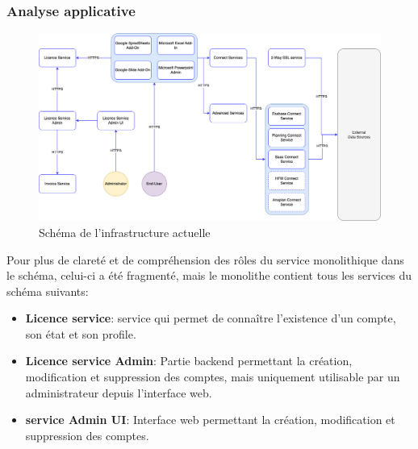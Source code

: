 \documentclass[a4paper, 11pt]{report}
\begin{document}
\subsubsection{Analyse applicative}
  \begin{figure}[h]
    \centering
    \includegraphics[scale=0.40,center]{schemas/schema-qibates-original.png}
    \caption{Schéma de l'infrastructure actuelle}
  \end{figure}
  Pour plus de clareté et de compréhension des rôles du service monolithique dans le schéma, celui-ci a été fragmenté, mais le monolithe contient tous les services du schéma suivants:
  \begin{itemize}
    \item \textbf{Licence service}: service qui permet de connaître l'existence d'un compte, son état et son profile.
    \item \textbf{Licence service Admin}: Partie backend permettant la création, modification et suppression des comptes, mais uniquement utilisable par un administrateur depuis l'interface web.
    \item \textbf{service Admin UI}: Interface web permettant la création, modification et suppression des comptes.
  \end{itemize}
\end{document}
